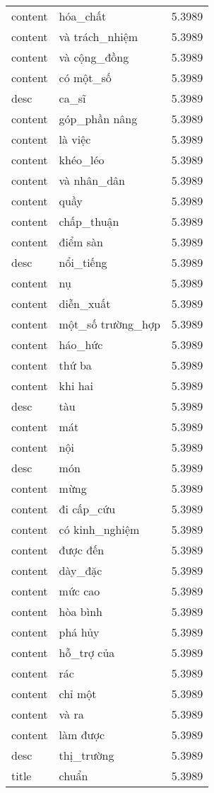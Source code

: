 \documentclass{article}
\begin{document}
\begin{tabular}{lll}
content & hóa\_chất & 5.3989\\
content & và trách\_nhiệm & 5.3989\\
content & và cộng\_đồng & 5.3989\\
content & có một\_số & 5.3989\\
desc & ca\_sĩ & 5.3989\\
content & góp\_phần nâng & 5.3989\\
content & là việc & 5.3989\\
content & khéo\_léo & 5.3989\\
content & và nhân\_dân & 5.3989\\
content & quầy & 5.3989\\
content & chấp\_thuận & 5.3989\\
content & điểm sàn & 5.3989\\
desc & nổi\_tiếng & 5.3989\\
content & nụ & 5.3989\\
content & diễn\_xuất & 5.3989\\
content & một\_số trường\_hợp & 5.3989\\
content & háo\_hức & 5.3989\\
content & thứ ba & 5.3989\\
content & khi hai & 5.3989\\
desc & tàu & 5.3989\\
content & mát & 5.3989\\
content & nội & 5.3989\\
desc & món & 5.3989\\
content & mừng & 5.3989\\
content & đi cấp\_cứu & 5.3989\\
content & có kinh\_nghiệm & 5.3989\\
content & được đến & 5.3989\\
content & dày\_đặc & 5.3989\\
content & mức cao & 5.3989\\
content & hòa bình & 5.3989\\
content & phá hủy & 5.3989\\
content & hỗ\_trợ của & 5.3989\\
content & rác & 5.3989\\
content & chỉ một & 5.3989\\
content & và ra & 5.3989\\
content & làm được & 5.3989\\
desc & thị\_trường & 5.3989\\
title & chuẩn & 5.3989\\

\end{tabular}
\end{document}
